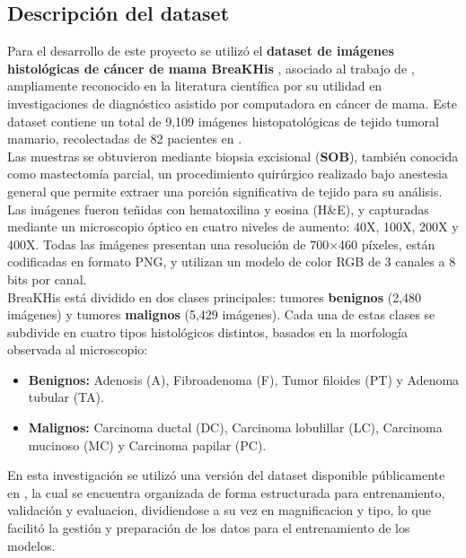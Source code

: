 \documentclass[12pt]{article} %
\begin{document}
\subsection{Descripción del dataset}
Para el desarrollo de este proyecto se utilizó el \textbf{dataset de imágenes histológicas de cáncer de mama BreaKHis} \cite{google_drive_folder}, asociado al trabajo de \cite{bardou2018classification}, ampliamente reconocido en la literatura científica por su utilidad en investigaciones de diagnóstico asistido por computadora en cáncer de mama. Este dataset contiene un total de 9,109 imágenes histopatológicas de tejido tumoral mamario, recolectadas de 82 pacientes en \cite{spanhol2015dataset}.\\

Las muestras se obtuvieron mediante biopsia excisional (\textbf{SOB}), también conocida como mastectomía parcial, un procedimiento quirúrgico realizado bajo anestesia general que permite extraer una porción significativa de tejido para su análisis. Las imágenes fueron teñidas con hematoxilina y eosina (H\&E), y capturadas mediante un microscopio óptico en cuatro niveles de aumento: 40X, 100X, 200X y 400X. Todas las imágenes presentan una resolución de 700×460 píxeles, están codificadas en formato PNG, y utilizan un modelo de color RGB de 3 canales a 8 bits por canal. \\

BreaKHis está dividido en dos clases principales: tumores \textbf{benignos} (2,480 imágenes) y tumores \textbf{malignos} (5,429 imágenes). Cada una de estas clases se subdivide en cuatro tipos histológicos distintos, basados en la morfología observada al microscopio: \\

\begin{itemize}
    \item \textbf{Benignos:} Adenosis (A), Fibroadenoma (F), Tumor filoides (PT) y Adenoma tubular (TA).
    \item \textbf{Malignos:} Carcinoma ductal (DC), Carcinoma lobulillar (LC), Carcinoma mucinoso (MC) y Carcinoma papilar (PC).
\end{itemize}

En esta investigación se utilizó una versión del dataset disponible públicamente en \cite{google_drive_folder}, la cual se encuentra organizada de forma estructurada para entrenamiento, validación y evaluacion, dividiendose a su vez en magnificacion y tipo, lo que facilitó la gestión y preparación de los datos para el entrenamiento de los modelos. \\
\end{document}
